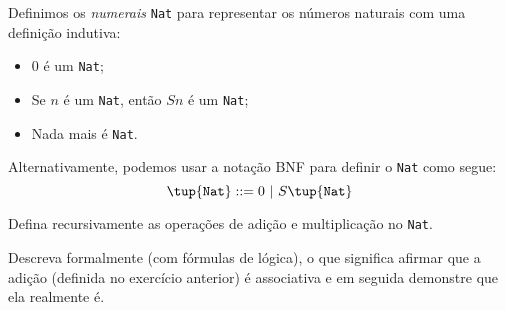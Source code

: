 \begin{definition}
    Definimos os \emph{numerais} \texttt{Nat} para representar os números 
    naturais com uma definição indutiva:

    \begin{itemize}
        \item 0 é um \texttt{Nat};
        \item Se $n$ é um \texttt{Nat}, então $Sn$ é um \texttt{Nat};
        \item Nada mais é \texttt{Nat}.
    \end{itemize}

    Alternativamente, podemos usar a notação BNF para definir o \texttt{Nat} como
    segue:
    $$
    \tup{\texttt{Nat}} \mathrel{::=} 0\ |\ S\tup{\texttt{Nat}}
    $$
\end{definition}

\begin{exercise}
    Defina recursivamente as operações de adição e multiplicação no \texttt{Nat}.
\end{exercise}

\begin{exercise}
    Descreva formalmente (com fórmulas de lógica), o que significa afirmar que a
    adição (definida no exercício anterior) é associativa e em seguida demonstre
    que ela realmente é.
\end{exercise}
